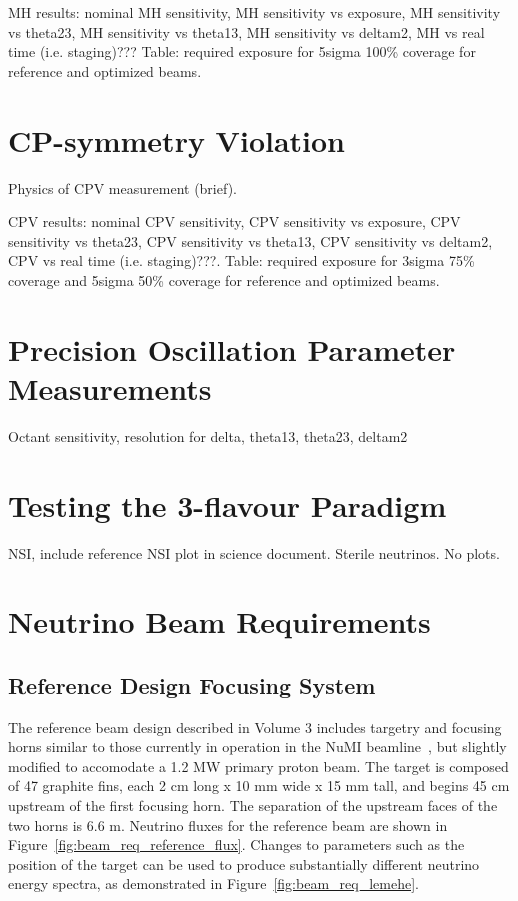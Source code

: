 MH results: nominal MH sensitivity, MH sensitivity vs exposure, MH sensitivity vs theta23, MH sensitivity vs theta13, MH sensitivity vs deltam2, MH vs real time (i.e. staging)???  Table: required exposure for 5sigma 100\% coverage for reference and optimized beams.

\section{CP-symmetry Violation}
\label{sec:physics-lbnosc-cpv}

Physics of CPV measurement (brief).

CPV results: nominal CPV sensitivity, CPV sensitivity vs exposure, CPV sensitivity vs theta23, CPV sensitivity vs theta13, CPV sensitivity vs deltam2, CPV vs real time (i.e. staging)???. Table: required exposure for 3sigma 75\% coverage and 5sigma 50\% coverage for reference and optimized beams.

\section{Precision Oscillation Parameter Measurements}

Octant sensitivity, resolution for delta, theta13, theta23, deltam2

\section{Testing the 3-flavour Paradigm}
\label{sec:physics-lbnosc-3nutests}

NSI, include reference NSI plot in science document.  Sterile neutrinos.  No plots.

\section{Neutrino Beam Requirements}
\label{sec:physics-lbnosc-beam-req}

\subsection{Reference Design Focusing System}
\label{subsec:reference-design-focusing-system}
The reference beam design described in Volume 3 includes targetry and
focusing horns similar to those currently in operation in the NuMI
beamline~\cite{numitdr}, but slightly modified to accomodate a 1.2 MW primary proton beam.  The
target is composed of 47 graphite fins, each 2 cm long x 10 mm wide x
15 mm tall, and begins 45 cm upstream of the first focusing horn.  The separation
of the upstream faces of the two horns is 6.6 m.  Neutrino fluxes for the reference beam are
shown in Figure~\ref{fig:beam_req_reference_flux}.  Changes to
parameters such as the position of the target can be used to produce substantially different neutrino
energy spectra, as demonstrated in Figure~\ref{fig:beam_req_lemehe}.

